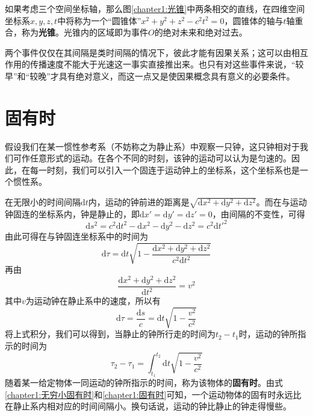 如果考虑三个空间坐标轴，那么图\ref{chapter1:光锥}中两条相交的直线，在四维空间坐标系$x,y,z,t$中将称为一个“圆锥体”$x^2+y^2+z^2-c^2t^2 = 0$，圆锥体的轴与$t$轴重合，称为{\bf 光锥}。光锥内的区域即为事件$O$的绝对未来和绝对过去。

两个事件仅仅在其间隔是类时间隔的情况下，彼此才能有因果关系；这可以由相互作用的传播速度不能大于光速这一事实直接推出来。也只有对这些事件来说，“较早”和“较晚”才具有绝对意义，而这一点又是使因果概念具有意义的必要条件。

\section{固有时}\label{chapter1:section固有时}

假设我们在某一惯性参考系（不妨称之为静止系）中观察一只钟，这只钟相对于我们可作任意形式的运动。在各个不同的时刻，该钟的运动可以认为是匀速的。因此，在每一时刻，我们可以引入一个固连于运动钟上的坐标系，这个坐标系也是一个惯性系。

在无限小的时间间隔$\mathrm{d}t$内，运动的钟前进的距离是$\sqrt{\mathrm{d}x^2 + \mathrm{d}y^2 + \mathrm{d}z^2}$。而在与运动钟固连的坐标系内，钟是静止的，即$\mathrm{d}x'= \mathrm{d}y' = \mathrm{d}z' = 0$，由间隔的不变性，可得
\begin{equation*}
	\mathrm{d}s^2 = c^2 \mathrm{d}t^2 - \mathrm{d}x^2 - \mathrm{d}y^2 - \mathrm{d}z^2 = c^2 \mathrm{d} t'^2
\end{equation*}
由此可得在与钟固连坐标系中的时间为
\begin{equation}
	\mathrm{d}\tau = \mathrm{d}t \sqrt{1-\frac{\mathrm{d}x^2 + \mathrm{d}y^2 + \mathrm{d}z^2}{c^2 \mathrm{d}t^2}}
	\label{chapter1:无穷小固有时}
\end{equation}
再由
\begin{equation*}
	\frac{\mathrm{d}x^2 + \mathrm{d}y^2 + \mathrm{d}z^2}{\mathrm{d}t^2} = v^2
\end{equation*}
其中$v$为运动钟在静止系中的速度，所以有
\begin{equation}
	\mathrm{d}\tau = \frac{\mathrm{d} s}{c} = \mathrm{d}t\sqrt{1-\frac{v^2}{c^2}}
	\label{chapter1:无穷小固有时}
\end{equation}
将上式积分，我们可以得到，当静止的钟所行走的时间为$t_2-t_1$时，运动的钟所指示的时间为
\begin{equation}
	\tau_2 - \tau_1 = \int_{t_1}^{t_2} \mathrm{d}t\sqrt{1-\frac{v^2}{c^2}}
	\label{chapter1:固有时}
\end{equation}
随着某一给定物体一同运动的钟所指示的时间，称为该物体的{\bf 固有时}。由式\eqref{chapter1:无穷小固有时}和\eqref{chapter1:固有时}可知，一个运动物体的固有时永远比在静止系内相对应的时间间隔小。换句话说，运动的钟比静止的钟走得慢些。

